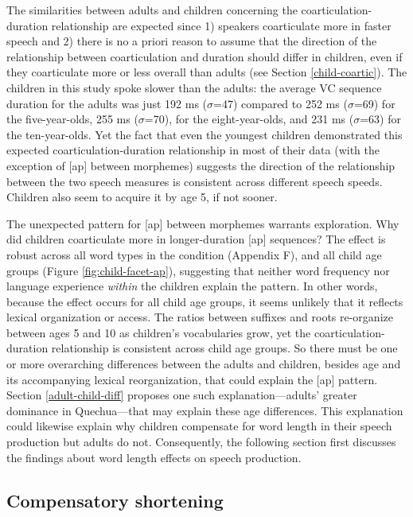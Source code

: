 \documentclass[a4paper,man,floatsintext,natbib,donotrepeattitle, apacite]{apa6}
\begin{document}
The similarities between adults and children concerning the coarticulation-duration relationship are expected since 1) speakers coarticulate more in faster speech and 2) there is no a priori reason to assume that the direction of the relationship between coarticulation and duration should differ in children, even if they coarticulate more or less overall than adults (see Section \ref{child-coartic}). The children in this study spoke slower than the adults: the average VC sequence duration for the adults was just 192 ms ($\sigma$=47) compared to 252 ms ($\sigma$=69) for the five-year-olds, 255 ms ($\sigma$=70), for the eight-year-olds, and 231 ms ($\sigma$=63) for the ten-year-olds. Yet the fact that even the youngest children demonstrated this expected coarticulation-duration relationship in most of their data (with the exception of [ap] between morphemes) suggests the direction of the relationship between the two speech measures is consistent across different speech speeds. Children also seem to acquire it by age 5, if not sooner. 

The unexpected pattern for [ap] between morphemes warrants exploration. Why did children coarticulate more in longer-duration [ap] sequences? The effect is robust across all word types in the condition (Appendix F), and all child age groups (Figure \ref{fig:child-facet-ap}), suggesting that neither word frequency nor language experience \textit{within} the children explain the pattern. In other words, because the effect occurs for all child age groups, it seems unlikely that it reflects lexical organization or access. The ratios between suffixes and roots re-organize between ages 5 and 10 as children's vocabularies grow, yet the coarticulation-duration relationship is consistent across child age groups. So there must be one or more overarching differences between the adults and children, besides age and its accompanying lexical reorganization, that could explain the [ap] pattern. Section \ref{adult-child-diff} proposes one such explanation---adults' greater dominance in Quechua---that may explain these age differences. This explanation could likewise explain why children compensate for word length in their speech production but adults do not. Consequently, the following section first discusses the findings about word length effects on speech production. 

\subsection{Compensatory shortening}\label{comp-lengthen}
\end{document}
